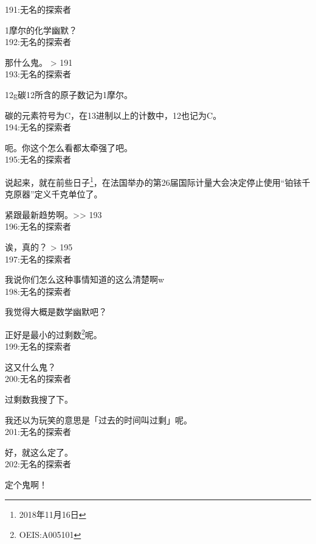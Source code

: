 191:无名的探索者

1摩尔的化学幽默？\\

192:无名的探索者

那什么鬼。 > 191\\

193:无名的探索者

12g碳12所含的原子数记为1摩尔。

碳的元素符号为C，在13进制以上的计数中，12也记为C。\\

194:无名的探索者

呃。你这个怎么看都太牵强了吧。\\

195:无名的探索者

说起来，就在前些日子\footnote{2018年11月16日}，在法国举办的第26届国际计量大会决定停止使用“铂铱千克原器”定义千克单位了。

紧跟最新趋势啊。>> 193\\

196:无名的探索者

诶，真的？ > 195\\

197:无名的探索者

我说你们怎么这种事情知道的这么清楚啊w\\

198:无名的探索者

我觉得大概是数学幽默吧？

正好是最小的过剩数\footnote{OEIS:A005101}呢。\\

199:无名的探索者

这又什么鬼？\\

200:无名的探索者

过剩数我搜了下。

我还以为玩笑的意思是「过去的时间叫过剩」呢。\\

201:无名的探索者

好，就这么定了。\\

202:无名的探索者

定个鬼啊！\\
